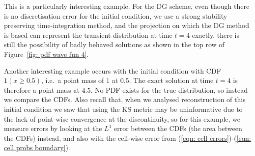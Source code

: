 \begin{example}
This is a particularly interesting example. For the DG scheme, even though there is no discretisation error for the initial condition, we use a strong stability preserving time-integration method, and the projection on which the DG method is based can represent the transient distribution at time \(t=4\) exactly, there is still the possibility of badly behaved solutions as shown in the top row of Figure~\ref{fig: pdf wave fun 4}.
\end{example}

\begin{example}\label{ex: wave 2}
Another interesting example occurs with the initial condition with CDF \(1(x\geq 0.5)\), i.e.~a point mass of 1 at \(0.5\). The exact solution at time \(t=4\) is therefore a point mass at \(4.5\). No PDF exists for the true distribution, so instead we compare the CDFs. Also recall that, when we analysed reconstruction of this initial condition we saw that using the KS metric may be uninformative due to the lack of point-wise convergence at the discontinuity, so for this example, we measure errors by looking at the \(L^1\) error between the CDFs (the area between the CDFs) instead, and also with the cell-wise error from (\ref{eqn: cell errors})-(\ref{eqn: cell probs boundary}).


\end{example}
